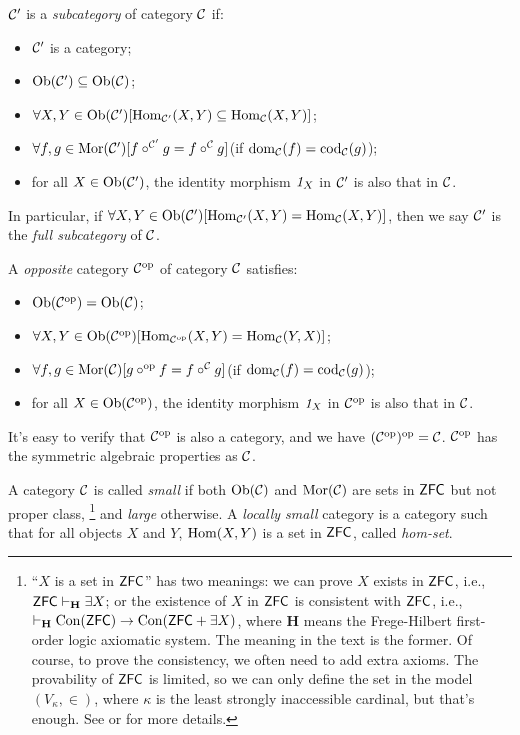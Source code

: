 \documentclass{article}
\begin{document}
\begin{defi}\label{subcategory, opposite category, small category}
	$\mathcal{C}'$ is a \emph{subcategory} of category $\mathcal{C}$ if:
	\begin{itemize}
		\item $\mathcal{C}'$ is a category;
		\item $\mathrm{Ob}(\mathcal{C}')\subseteq\mathrm{Ob}(\mathcal{C})$;
		\item $\forall X,Y\in\mathrm{Ob}(\mathcal{C}')[\mathrm{Hom}_{\mathcal{C}'}(X,Y)\subseteq\mathrm{Hom}_{\mathcal{C}}(X,Y)]$;
		\item $\forall f,g\in\mathrm{Mor}(\mathcal{C}')[f\circ^{\mathcal{C}'}g=f\circ^{\mathcal{C}}g]$\quad(if $\mathrm{dom}_{\mathcal{C}}(f)=\mathrm{cod}_{\mathcal{C}}(g)$);
		\item for all $X\in\mathrm{Ob}(\mathcal{C}')$, the identity morphism $\mathit{1}_X$ in $\mathcal{C}'$ is also that in $\mathcal{C}$.
	\end{itemize}
	In particular, if $\forall X,Y\in\mathrm{Ob}(\mathcal{C}')[\mathrm{Hom}_{\mathcal{C}'}(X,Y)=\mathrm{Hom}_{\mathcal{C}}(X,Y)]$, then we say 	$\mathcal{C}'$ is the \emph{full subcategory} of $\mathcal{C}$.
	
	A \emph{opposite} category $\mathcal{C}^\mathrm{op}$ of category $\mathcal{C}$ satisfies:
	\begin{itemize}
		\item $\mathrm{Ob}(\mathcal{C}^\mathrm{op})=\mathrm{Ob}(\mathcal{C})$;
		\item $\forall X,Y\in\mathrm{Ob}(\mathcal{C}^\mathrm{op})[\mathrm{Hom}_{\mathcal{C}^\mathrm{op}}(X,Y)=\mathrm{Hom}_{\mathcal{C}}(Y,X)]$;
		\item $\forall f,g\in\mathrm{Mor}(\mathcal{C})[g\circ^\mathrm{op} f=f\circ^{\mathcal{C}} g]$\quad(if $\mathrm{dom}_{\mathcal{C}}(f)=\mathrm{cod}_{\mathcal{C}}(g)$);
		\item for all $X\in\mathrm{Ob}(\mathcal{C}^\mathrm{op})$, the identity morphism $\mathit{1}_X$ in $\mathcal{C}^\mathrm{op}$ is also that in $\mathcal{C}$.
	\end{itemize}
	It's easy to verify that $\mathcal{C}^\mathrm{op}$ is also a category, and we have $(\mathcal{C}^\mathrm{op})^\mathrm{op}=\mathcal{C}$. $\mathcal{C}^\mathrm{op}$ has the symmetric algebraic properties as $\mathcal{C}$.
	
	A category $\mathcal{C}$ is called \emph{small} if both $\mathrm{Ob}(\mathcal{C})$ and $\mathrm{Mor}(\mathcal{C})$ are sets in $\mathsf{ZFC}$ but not proper class,
	 \footnote{``$X$ is a set in $\mathsf{ZFC}$'' has two meanings: we can prove $X$ exists in $\mathsf{ZFC}$, i.e., $\mathsf{ZFC}\vdash_\mathbf{H}\exists X$; or the existence of $X$ in $\mathsf{ZFC}$ is consistent with $\mathsf{ZFC}$, i.e., $\vdash_\mathbf{H}\mathrm{\mathrm{Con}}(\mathsf{ZFC})\to\mathrm{Con}(\mathsf{ZFC}+\exists X)$, where $\mathbf{H}$ means the Frege-Hilbert first-order logic axiomatic system. The meaning in the text is the former. Of course, to prove the consistency, we often need to add extra axioms. The provability of $\mathsf{ZFC}$ is limited, so we can only define the set in the model $(V_\kappa,\in)$, where $\kappa$ is the least strongly inaccessible cardinal, but that's enough. See \cite{set-1} or \cite{mod-1} for more details.}
	and \emph{large} otherwise. A \emph{locally small} category is a category such that for all objects $X$ and $Y$, $\mathrm{Hom}(X,Y)$ is a set in $\mathsf{ZFC}$, called \emph{hom-set}.
\end{defi}
\end{document}
